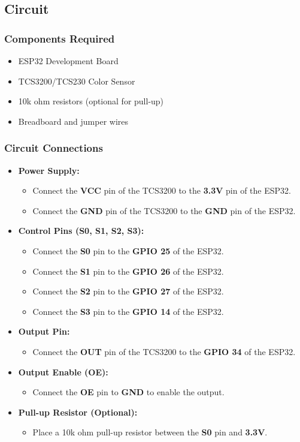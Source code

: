 \subsection*{Circuit}

\subsubsection*{Components Required}
\begin{itemize}
	\item ESP32 Development Board
	\item TCS3200/TCS230 Color Sensor
	\item 10k ohm resistors (optional for pull-up)
	\item Breadboard and jumper wires
\end{itemize}

\subsubsection*{Circuit Connections}
\begin{itemize}
	\item \textbf{Power Supply:}
	\begin{itemize}
		\item Connect the \textbf{VCC} pin of the TCS3200 to the \textbf{3.3V} pin of the ESP32.
		\item Connect the \textbf{GND} pin of the TCS3200 to the \textbf{GND} pin of the ESP32.
	\end{itemize}
	\item \textbf{Control Pins (S0, S1, S2, S3):}
	\begin{itemize}
		\item Connect the \textbf{S0} pin to the \textbf{GPIO 25} of the ESP32.
		\item Connect the \textbf{S1} pin to the \textbf{GPIO 26} of the ESP32.
		\item Connect the \textbf{S2} pin to the \textbf{GPIO 27} of the ESP32.
		\item Connect the \textbf{S3} pin to the \textbf{GPIO 14} of the ESP32.
	\end{itemize}
	\item \textbf{Output Pin:}
	\begin{itemize}
		\item Connect the \textbf{OUT} pin of the TCS3200 to the \textbf{GPIO 34} of the ESP32.
	\end{itemize}
	\item \textbf{Output Enable (OE):}
	\begin{itemize}
		\item Connect the \textbf{OE} pin to \textbf{GND} to enable the output.
	\end{itemize}
	\item \textbf{Pull-up Resistor (Optional):}
	\begin{itemize}
		\item Place a 10k ohm pull-up resistor between the \textbf{S0} pin and \textbf{3.3V}.
	\end{itemize}
\end{itemize}


